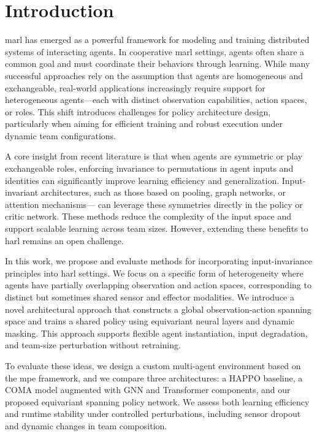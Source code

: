 \section{Introduction}

\Gls{marl} has emerged as a powerful framework for modeling and 
training distributed systems of interacting agents. 
In cooperative \gls{marl} settings, agents often share a common goal and 
must coordinate their behaviors through learning. 
While many successful approaches rely on the assumption that agents are 
homogeneous and exchangeable, real-world applications increasingly 
require support for heterogeneous agents—each with distinct observation capabilities, 
action spaces, or roles. 
This shift introduces challenges for policy architecture design, 
particularly when aiming for efficient training and robust 
execution under dynamic team configurations.

A core insight from recent literature is that when agents 
are symmetric or play exchangeable roles, enforcing invariance 
to permutations in agent inputs and identities can significantly 
improve learning efficiency and generalization. 
Input-invariant architectures, such as those based on pooling, 
graph networks, or attention mechanisms—
can leverage these symmetries
directly in the policy or critic network. 
These methods reduce the complexity of the input space 
and support scalable learning across team sizes. 
However, extending these benefits to \gls{harl} remains an open challenge.

In this work, we propose and evaluate methods for incorporating 
input-invariance principles into \gls{harl} settings. 
We focus on a specific form of heterogeneity where agents 
have partially overlapping observation and action spaces, 
corresponding to distinct but sometimes shared sensor and effector modalities. 
We introduce a novel architectural approach that constructs a 
global observation-action spanning space and trains a 
shared policy using equivariant neural layers and dynamic masking. 
This approach supports flexible agent instantiation, input degradation, 
and team-size perturbation without retraining.

To evaluate these ideas, we design a custom multi-agent 
environment based on the \gls{mpe} framework, and we compare three architectures: 
a HAPPO baseline, a COMA model augmented with GNN and Transformer components, 
and our proposed equivariant spanning policy network. 
We assess both learning efficiency and runtime stability 
under controlled perturbations, including sensor dropout 
and dynamic changes in team composition.

